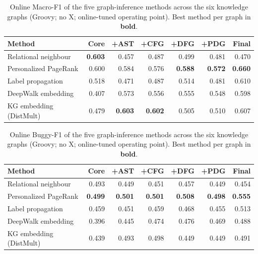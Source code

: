 \begin{table}[H]
\centering \small
\caption{Online Macro-F1 of the five graph-inference methods across the six knowledge graphs (Groovy; no X; online-tuned operating point). Best method per graph in \textbf{bold}.}
\label{tab:v4-final-macro_f1}
\begin{tabular}{lrrrrrr}
\toprule
Method & Core & +AST & +CFG & +DFG & +PDG & Final \\
\midrule
Relational neighbour & \textbf{0.603} & 0.457 & 0.487 & 0.499 & 0.481 & 0.470 \\
Personalized PageRank & 0.600 & 0.584 & 0.576 & \textbf{0.588} & \textbf{0.572} & \textbf{0.660} \\
Label propagation & 0.518 & 0.471 & 0.487 & 0.514 & 0.481 & 0.610 \\
DeepWalk embedding & 0.407 & 0.573 & 0.556 & 0.555 & 0.548 & 0.598 \\
KG embedding (DistMult) & 0.479 & \textbf{0.603} & \textbf{0.602} & 0.505 & 0.510 & 0.607 \\
\bottomrule
\end{tabular}
\end{table}

\begin{table}[H]
\centering \small
\caption{Online Buggy-F1 of the five graph-inference methods across the six knowledge graphs (Groovy; no X; online-tuned operating point). Best method per graph in \textbf{bold}.}
\label{tab:v4-final-buggy_f1}
\begin{tabular}{lrrrrrr}
\toprule
Method & Core & +AST & +CFG & +DFG & +PDG & Final \\
\midrule
Relational neighbour & 0.493 & 0.449 & 0.451 & 0.457 & 0.449 & 0.454 \\
Personalized PageRank & \textbf{0.499} & \textbf{0.501} & \textbf{0.501} & \textbf{0.508} & \textbf{0.498} & \textbf{0.555} \\
Label propagation & 0.459 & 0.451 & 0.459 & 0.468 & 0.455 & 0.513 \\
DeepWalk embedding & 0.396 & 0.445 & 0.474 & 0.476 & 0.469 & 0.488 \\
KG embedding (DistMult) & 0.439 & 0.493 & 0.498 & 0.449 & 0.449 & 0.491 \\
\bottomrule
\end{tabular}
\end{table}

